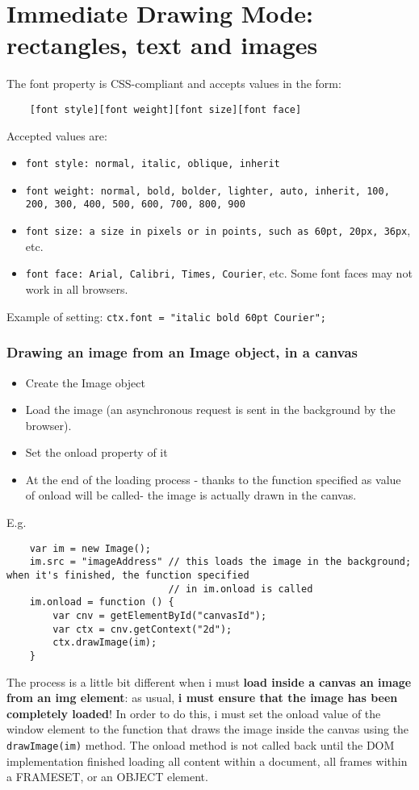 \documentclass[a4paper,11pt]{book}
\begin{document}
	
\section{Immediate Drawing Mode: rectangles, text and images}
	The font property is CSS-compliant and accepts values in the form:
	\begin{verbatim}
	[font style][font weight][font size][font face]
	\end{verbatim}
	Accepted values are:
	\begin{itemize}
	\item \texttt{font style: normal, italic, oblique, inherit}
	\item \texttt{font weight: normal, bold, bolder, lighter, auto, inherit, 100, 200, 300, 400, 500, 600, 700, 800, 900}
	\item \texttt{font size: a size in pixels or in points, such as 60pt, 20px, 36px}, etc.
	\item \texttt{font face: Arial, Calibri, Times, Courier}, etc. Some font faces may not work in all browsers.
	\end{itemize}
	Example of setting:
	\texttt{ctx.font = "italic bold 60pt Courier";}
	\subsubsection{Drawing an image from an Image object, in a canvas}
	\begin{itemize}
	\item Create the Image object
	\item Load the image (an asynchronous request is sent in the background by the browser).
	\item Set the onload property of it
	\item At the end of the loading process - thanks to the function specified as value of onload will be called-
		the image is actually drawn in the canvas.
	\end{itemize}
	E.g.
	\begin{verbatim}
	var im = new Image();
	im.src = "imageAddress" // this loads the image in the background; when it's finished, the function specified
							// in im.onload is called
	im.onload = function () {
		var cnv = getElementById("canvasId");
		var ctx = cnv.getContext("2d");
		ctx.drawImage(im);
	}
	\end{verbatim}
	
	The process is a little bit different when i must \textbf{load inside a canvas an image from an img element}:
	as usual, \textbf{i must ensure that the image has been completely loaded}! In order to do this, i must set the onload
	value of the window element to the function that draws the image inside the canvas using the
	\texttt{drawImage(im)} method. The onload method is not called back until the DOM implementation finished loading
	all content within a document, all frames within a FRAMESET, or an OBJECT element.
\end{document}
